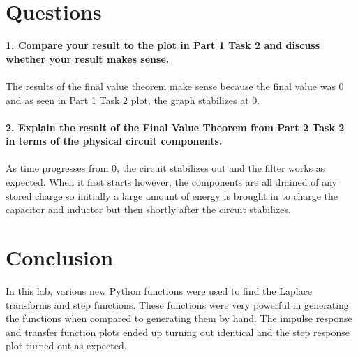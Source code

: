 \documentclass[12pt]{report}
\begin{document}
\section{Questions}
\textbf{1. Compare your result to the plot in Part 1 Task 2 and discuss whether your result makes
sense.}
\\ \\The results of the final value theorem make sense because the final value was 0 and as seen in Part 1 Task 2 plot, the graph stabilizes at 0.
\\ \\ \textbf{2. Explain the result of the Final Value Theorem from Part 2 Task 2 in terms of the physical circuit components.}
\\ \\As time progresses from 0, the circuit stabilizes out and the filter works as expected. When it first starts however, the components are all drained of any stored charge so initially a large amount of energy is brought in to charge the capacitor and inductor but then shortly after the circuit stabilizes.


\section{Conclusion}
In this lab, various new Python functions were used to find the Laplace transforms and step functions. These functions were very powerful in generating the functions when compared to generating them by hand. The impulse response and transfer function plots ended up turning out identical and the step response plot turned out as expected.
\end{document}
